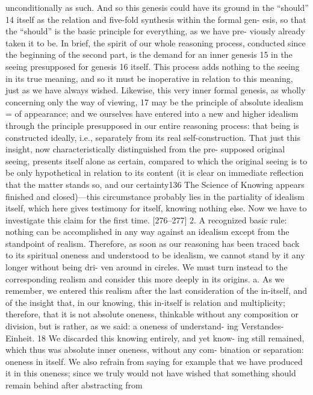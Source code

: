 unconditionally as such. And so this genesis could have its ground in the
“should” 14 itself as the relation and five-fold synthesis within the formal gen-
esis, so that the “should” is the basic principle for everything, as we have pre-
viously already taken it to be. In brief, the spirit of our whole reasoning
process, conducted since the beginning of the second part, is the demand for
an inner genesis 15 in the seeing presupposed for genesis 16 itself. This process
adds nothing to the seeing in its true meaning, and so it must be inoperative
in relation to this meaning, just as we have always wished. Likewise, this very
inner formal genesis, as wholly concerning only the way of viewing, 17 may be
the principle of absolute idealism = of appearance; and we ourselves have
entered into a new and higher idealism through the principle presupposed in
our entire reasoning process: that being is constructed ideally, i.e., separately
from its real self-construction.
That just this insight, now characteristically distinguished from the pre-
supposed original seeing, presents itself alone as certain, compared to which
the original seeing is to be only hypothetical in relation to its content (it is
clear on immediate reflection that the matter stands so, and our certainty136
The Science of Knowing
appears finished and closed)—this circumstance probably lies in the partiality
of idealism itself, which here gives testimony for itself, knowing nothing else.
Now we have to investigate this claim for the first time.
[276–277] 2. A recognized basic rule: nothing can be accomplished in
any way against an idealism except from the standpoint of realism. Therefore,
as soon as our reasoning has been traced back to its spiritual oneness and
understood to be idealism, we cannot stand by it any longer without being dri-
ven around in circles. We must turn instead to the corresponding realism and
consider this more deeply in its origins.
a. As we remember, we entered this realism after the last consideration
of the in-itself, and of the insight that, in our knowing, this in-itself is relation
and multiplicity; therefore, that it is not absolute oneness, thinkable without
any composition or division, but is rather, as we said: a oneness of understand-
ing {Verstandes-Einheit}. 18 We discarded this knowing entirely, and yet know-
ing still remained, which thus was absolute inner oneness, without any com-
bination or separation: oneness in itself. We also refrain from saying for
example that we have produced it in this oneness; since we truly would not
have wished that something should remain behind after abstracting from
